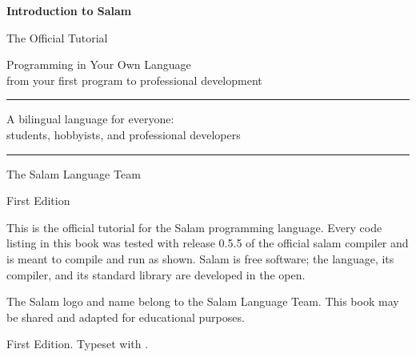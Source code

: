 \documentclass[11pt,a4paper,openright]{book}
\newcommand{\code}[1]{{\salamcodefont\small #1}}
\begin{document}
\begin{titlepage}
\centering
\vspace*{2.2cm}
{\Huge\bfseries Introduction to Salam\par}
\vspace{0.7cm}
{\LARGE The Official Tutorial\par}
\vspace{1.4cm}
{\large Programming in Your Own Language\\[4pt]
from your first program to professional development\par}
\vspace{2.6cm}
\rule{0.65\textwidth}{0.6pt}\par
\vspace{0.8cm}
{\large A bilingual language for everyone:\\[4pt]
students, hobbyists, and professional developers\par}
\vspace{0.8cm}
\rule{0.65\textwidth}{0.6pt}\par
\vfill
{\large The Salam Language Team\par}
\vspace{0.35cm}
{\normalsize First Edition\par}
\end{titlepage}

\thispagestyle{empty}
\noindent\small
This is the official tutorial for the Salam programming language. Every code
listing in this book was tested with release 0.5.5 of the official \code{salam}
compiler and is meant to compile and run as shown. Salam is free software; the language, its
compiler, and its standard library are developed in the open.\par
\vspace{0.3cm}
\noindent The Salam logo and name belong to the Salam Language Team. This book
may be shared and adapted for educational purposes.\par
\vspace{0.3cm}
\noindent First Edition. Typeset with \XeLaTeX{}.\par
\normalsize
\clearpage

\frontmatter


\tableofcontents
\clearpage

\mainmatter
























\appendix




\end{document}
